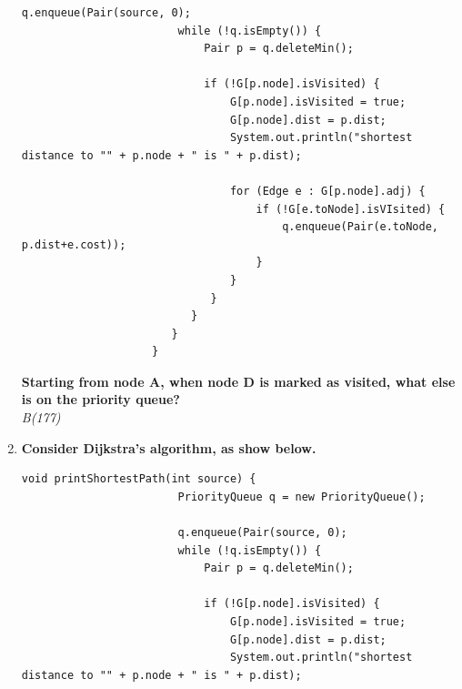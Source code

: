 \documentclass[10pt]{article}
\begin{document}
\begin{enumerate}
\begin{lstlisting}[style=java]
                        q.enqueue(Pair(source, 0);
                        while (!q.isEmpty()) {
                            Pair p = q.deleteMin();
                    
                            if (!G[p.node].isVisited) {
                                G[p.node].isVisited = true;
                                G[p.node].dist = p.dist;
                                System.out.println("shortest distance to "" + p.node + " is " + p.dist);
                    
                                for (Edge e : G[p.node].adj) {
                                    if (!G[e.toNode].isVIsited) {
                                        q.enqueue(Pair(e.toNode, p.dist+e.cost));
                                    }
                                }
                             }
                          }
                       }
                    }
                \end{lstlisting}
          \textbf{Starting from node A, when node D is marked as visited, what else is on the priority queue?}\\
          \textit{B(177)}
    \item \textbf{Consider Dijkstra's algorithm, as show below.}\\
          \begin{lstlisting}[style=java]
                    void printShortestPath(int source) {
                        PriorityQueue q = new PriorityQueue();
                    
                        q.enqueue(Pair(source, 0);
                        while (!q.isEmpty()) {
                            Pair p = q.deleteMin();
                    
                            if (!G[p.node].isVisited) {
                                G[p.node].isVisited = true;
                                G[p.node].dist = p.dist;
                                System.out.println("shortest distance to "" + p.node + " is " + p.dist);
                    

\end{lstlisting}
\end{enumerate}
\end{document}
